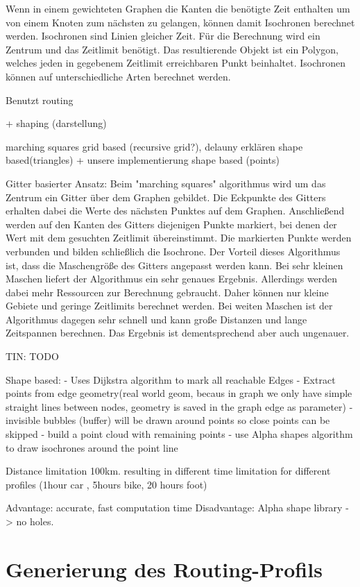 \documentclass[10pt,a4paper]{article}
\begin{document}
Wenn in einem gewichteten Graphen die Kanten die benötigte Zeit enthalten um von einem Knoten zum nächsten zu gelangen, können damit Isochronen berechnet werden.
Isochronen sind Linien gleicher Zeit. Für die Berechnung wird ein Zentrum und das Zeitlimit benötigt. Das resultierende Objekt ist ein Polygon, welches jeden in gegebenem Zeitlimit erreichbaren Punkt beinhaltet.
Isochronen können auf unterschiedliche Arten berechnet werden. 

Benutzt routing

+ shaping (darstellung)

marching squares grid based (recursive grid?), delauny erklären shape based(triangles) + unsere implementierung shape based (points)

Gitter basierter Ansatz:
Beim "marching squares" algorithmus wird um das Zentrum ein Gitter über dem Graphen gebildet. Die Eckpunkte des Gitters erhalten dabei die Werte des nächsten Punktes auf dem Graphen. Anschließend werden auf den Kanten des Gitters diejenigen Punkte markiert, bei denen der Wert mit dem gesuchten Zeitlimit übereinstimmt. Die markierten Punkte werden verbunden und bilden schließlich die Isochrone.
Der Vorteil dieses Algorithmus ist, dass die Maschengröße des Gitters angepasst werden kann. Bei sehr kleinen Maschen liefert der Algorithmus ein sehr genaues Ergebnis. Allerdings werden dabei mehr Ressourcen zur Berechnung gebraucht. Daher können nur kleine Gebiete und geringe Zeitlimits berechnet werden. Bei weiten Maschen ist der Algorithmus dagegen sehr schnell und kann große Distanzen und lange Zeitspannen berechnen. Das Ergebnis ist dementsprechend aber auch ungenauer.

TIN:
TODO

Shape based:
- Uses Dijkstra algorithm to mark all reachable Edges
- Extract points from edge geometry(real world geom, becaus in graph we only have simple straight lines between nodes, geometry is saved in the graph edge as parameter)
- invisible bubbles (buffer) will be drawn around points so close points can be skipped
- build a point cloud with remaining points
- use Alpha shapes algorithm to draw isochrones around the point line

 Distance limitation 100km. resulting in different time limitation for different profiles (1hour car , 5hours bike, 20 hours foot)

Advantage: accurate, fast computation time
Disadvantage: Alpha shape library -> no holes.



\section{Generierung des Routing-Profils}
\end{document}
